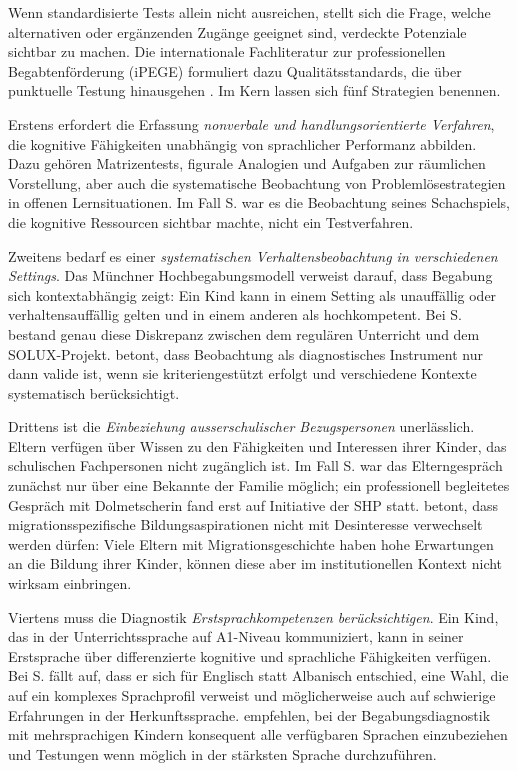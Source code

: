 \documentclass[ngerman, a4paper]{article}
\begin{document}
Wenn standardisierte Tests allein nicht ausreichen, stellt sich die Frage, welche
alternativen oder ergänzenden Zugänge geeignet sind, verdeckte Potenziale sichtbar zu
machen. Die internationale Fachliteratur zur professionellen Begabtenförderung (iPEGE)
formuliert dazu Qualitätsstandards, die über punktuelle Testung hinausgehen
\parencite{ipege2009professionelle}. Im Kern lassen sich fünf Strategien benennen.

Erstens erfordert die Erfassung \textit{nonverbale und handlungsorientierte Verfahren}, die
kognitive Fähigkeiten unabhängig von sprachlicher Performanz abbilden. Dazu gehören
Matrizentests, figurale Analogien und Aufgaben zur räumlichen Vorstellung, aber auch
die systematische Beobachtung von Problemlösestrategien in offenen Lernsituationen.
Im Fall S. war es die Beobachtung seines Schachspiels, die kognitive Ressourcen sichtbar
machte, nicht ein Testverfahren.

Zweitens bedarf es einer \textit{systematischen Verhaltensbeobachtung in verschiedenen
Settings}. Das Münchner Hochbegabungsmodell verweist darauf, dass Begabung sich
kontextabhängig zeigt: Ein Kind kann in einem Setting als unauffällig oder
verhaltensauffällig gelten und in einem anderen als hochkompetent. Bei S. bestand genau
diese Diskrepanz zwischen dem regulären Unterricht und dem SOLUX-Projekt.
\textcite{trautmann2016einfuehrung} betont, dass Beobachtung als diagnostisches Instrument nur dann valide
ist, wenn sie kriteriengestützt erfolgt und verschiedene Kontexte systematisch
berücksichtigt.

Drittens ist die \textit{Einbeziehung ausserschulischer Bezugspersonen} unerlässlich.
Eltern verfügen über Wissen zu den Fähigkeiten und Interessen ihrer Kinder, das
schulischen Fachpersonen nicht zugänglich ist. Im Fall S. war das Elterngespräch zunächst
nur über eine Bekannte der Familie möglich; ein professionell begleitetes Gespräch mit
Dolmetscherin fand erst auf Initiative der SHP statt. \textcite{uslucan2012begabung} betont, dass
migrationsspezifische Bildungsaspirationen nicht mit Desinteresse verwechselt werden
dürfen: Viele Eltern mit Migrationsgeschichte haben hohe Erwartungen an die Bildung
ihrer Kinder, können diese aber im institutionellen Kontext nicht wirksam einbringen.

Viertens muss die Diagnostik \textit{Erstsprachkompetenzen berücksichtigen}. Ein Kind,
das in der Unterrichtssprache auf A1-Niveau kommuniziert, kann in seiner Erstsprache
über differenzierte kognitive und sprachliche Fähigkeiten verfügen. Bei S. fällt auf,
dass er sich für Englisch statt Albanisch entschied, eine Wahl, die auf ein komplexes
Sprachprofil verweist und möglicherweise auch auf schwierige Erfahrungen in der
Herkunftssprache. \textcite{reutlinger2015hochbegabung} empfehlen, bei der Begabungsdiagnostik mit
mehrsprachigen Kindern konsequent alle verfügbaren Sprachen einzubeziehen und
Testungen wenn möglich in der stärksten Sprache durchzuführen.
\end{document}
